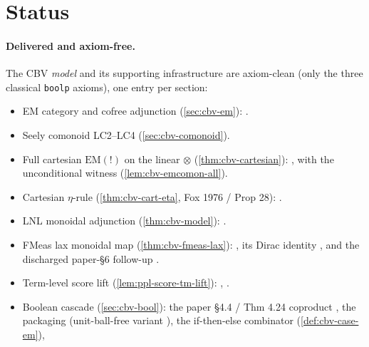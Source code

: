 \section{Status}\label{sec:cbv-status}

\paragraph{Delivered and axiom-free.}
The CBV \emph{model} and its supporting infrastructure are axiom-clean
(only the three classical \texttt{boolp} axioms), one entry per section:
\begin{itemize}
  \item EM category and cofree adjunction (\autoref{sec:cbv-em}):
    .
  \item Seely comonoid LC2--LC4 (\autoref{sec:cbv-comonoid}).
  \item Full cartesian $\mathrm{EM}(\mathord{!})$ on the linear
    $\otimes$ (\autoref{thm:cbv-cartesian}):
    , with the
    unconditional witness 
    (\autoref{lem:cbv-emcomon-all}).
  \item Cartesian $\eta$-rule (\autoref{thm:cbv-cart-eta}, Fox 1976 /
    Prop 28):
    .
  \item LNL monoidal adjunction (\autoref{thm:cbv-model}):
    .
  \item FMeas lax monoidal map (\autoref{thm:cbv-fmeas-lax}):
    , its Dirac identity
    , and the discharged
    paper-\S6 follow-up
    .
  \item Term-level score lift (\autoref{lem:ppl-score-tm-lift}):
    ,
    .
  \item Boolean cascade (\autoref{sec:cbv-bool}): the paper \S4.4 /
    Thm 4.24 coproduct
    , the packaging
    (unit-ball-free variant
    ),
    the if-then-else combinator
     (\autoref{def:cbv-case-em}),

\end{itemize}
